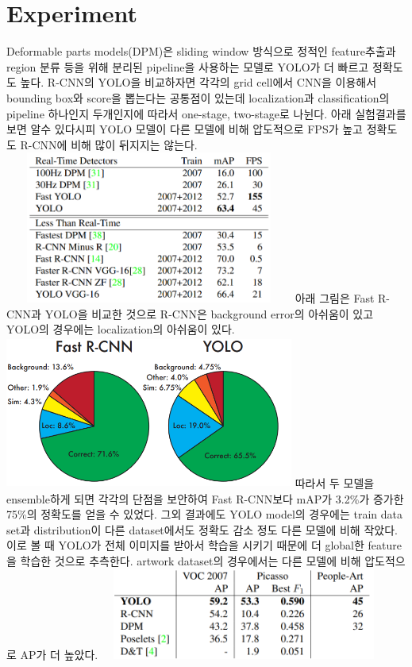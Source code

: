 \documentclass[extendedabs]{bmvc2k}
\begin{document}
\section{Experiment}
\quad Deformable parts models(DPM)은 sliding window 방식으로 정적인 feature추출과 region 분류 등을 위해 분리된 pipeline을 사용하는 모델로
YOLO가 더 빠르고 정확도도 높다. R-CNN의 YOLO을 비교하자면 각각의 grid cell에서 CNN을 이용해서 bounding box와 score을 뽑는다는 공통점이 있는데 localization과 classification의
pipeline 하나인지 두개인지에 따라서 one-stage, two-stage로 나뉜다.
아래 실험결과를 보면 알수 있다시피 YOLO 모델이 다른 모델에 비해 압도적으로 FPS가 높고 정확도도 R-CNN에 비해 많이 뒤지지는 않는다.
\newline  \includegraphics[width=9.5cm, height =5cm]{images/05_YOLO.PNG}
\newline 아래 그림은 Fast R-CNN과 YOLO을 비교한 것으로 R-CNN은 background error의 아쉬움이 있고 YOLO의 경우에는 localization의 아쉬움이 있다.
\newline  \includegraphics[width=9.5cm, height =5cm]{images/06_YOLO.PNG}
\newline 따라서 두 모델을 ensemble하게 되면 각각의 단점을 보안하여 Fast R-CNN보다 mAP가 3.2\%가 증가한 75\%의 정확도를 얻을 수 있었다. 
그외 결과에도 YOLO model의 경우에는 train data set과 distribution이 다른 dataset에서도 정확도 감소 정도 다른 모델에 비해 작았다. 이로 볼 때 YOLO가 
전체 이미지를 받아서 학습을 시키기 때문에 더 global한 feature을 학습한 것으로 추측한다. artwork dataset의 경우에서는 다른 모델에 비해 
압도적으로 AP가 더 높았다. 
\newline  \includegraphics[width=9.5cm, height =3cm]{images/07_YOLO.PNG}
\end{document}
